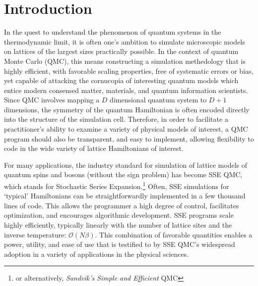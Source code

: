 \documentclass[vecphys]{svmult}
\begin{document}
\section{Introduction}
\label{sec:1}
In the quest to understand the phenomenon of quantum systems in the thermodynamic limit, it is often one's ambition to simulate
microscopic models on lattices of the largest sizes practically possible.  In the context of quantum Monte Carlo (QMC), this means
constructing a simulation methedology that is highly efficient, with favorable scaling properties, free of systematic errors or bias, yet capable of attacking the cornucopia of interesting quantum models which entice modern consensed matter, materials, and quantum information scientists.
Since QMC involves mapping a $D$ dimensional quantum system to $D+1$ dimensions, the symmetry of the quantum Hamiltonian is often encoded directly into the structure of the simulation cell.  Therefore, in order to facilitate a practitioner's ability to examine a variety of physical models of interest, a QMC program should also be transparent, and easy to implement, allowing flexibility to code in the wide variety of lattice Hamiltonians of interest. %

For many applications, the industry standard for simulation of lattice models of quantum spins and bosons (without the sign problem) has become SSE QMC, which stands for Stochastic Series Expansion.\footnote{or alternatively, \textit{Sandvik's Simple and Efficient} QMC}   Often, SSE simulations for \lq typical' Hamiltonians can be straightforwardly implemented in a few thousand lines of code.
This allows the programmer a high degree of control, facilitates optimization, and encourages algorithmic development.
SSE programs scale highly efficiently, typically linearly with the number of lattice sites and the inverse temperature: $\mathcal{O}(N\beta)$.  This combination of favorable quantities enables a power, utility, and ease of use that is testified to by SSE QMC's widespread adoption in a variety of applications in the physical sciences.
\end{document}
